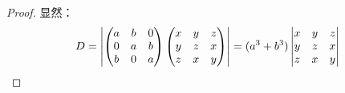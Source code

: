 \begin{proof}
	显然：
	\begin{equation*}
		D=\left|
		\begin{pmatrix}
			a & b & 0 \\
			0 & a & b \\
			b & 0 & a
		\end{pmatrix}
		\begin{pmatrix}
			x & y & z \\
			y & z & x \\
			z & x & y
		\end{pmatrix}
		\right|
		=(a^3+b^3)
		\begin{vmatrix}
			x & y & z \\
			y & z & x \\
			z & x & y
		\end{vmatrix}\qedhere
	\end{equation*}
\end{proof}

